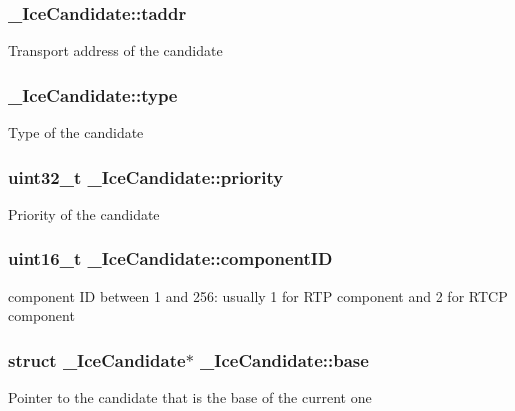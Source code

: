 \subsubsection[{taddr}]{ \-\_\-\-Ice\-Candidate\-::taddr}\label{struct__IceCandidate_a4297288cc2d0127fb346031078e75a63}
Transport address of the candidate 
\subsubsection[{type}]{ \-\_\-\-Ice\-Candidate\-::type}\label{struct__IceCandidate_a40fd8e97d3153bc1206030e59b89f0f7}
Type of the candidate 
\subsubsection[{priority}]{\setlength{\rightskip}{0pt plus 5cm}uint32\-\_\-t \-\_\-\-Ice\-Candidate\-::priority}\label{struct__IceCandidate_aad4c4e08afff5c03e553894f0c1a4e43}
Priority of the candidate 
\subsubsection[{component\-I\-D}]{\setlength{\rightskip}{0pt plus 5cm}uint16\-\_\-t \-\_\-\-Ice\-Candidate\-::component\-I\-D}\label{struct__IceCandidate_af6fe32c2614ae53a3bd2b011b242742a}
component I\-D between 1 and 256\-: usually 1 for R\-T\-P component and 2 for R\-T\-C\-P component 
\subsubsection[{base}]{\setlength{\rightskip}{0pt plus 5cm}struct {\bf \-\_\-\-Ice\-Candidate}$\ast$ \-\_\-\-Ice\-Candidate\-::base}\label{struct__IceCandidate_ad14144870c6579183cabb7f7fb5086d4}
Pointer to the candidate that is the base of the current one 
